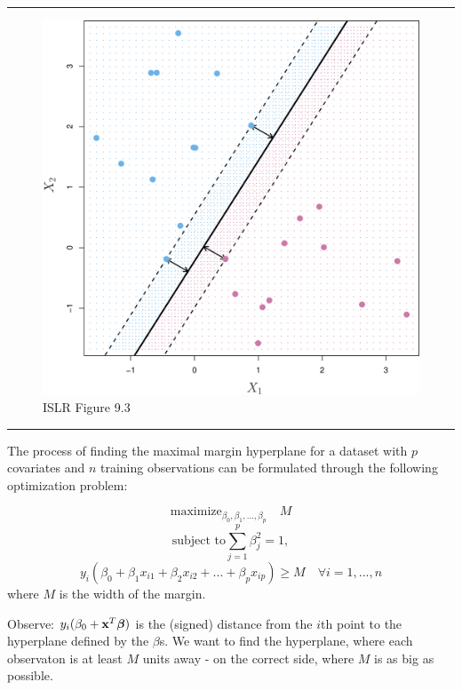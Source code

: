 \documentclass[]{article}
\begin{document}
\begin{center}\rule{0.5\linewidth}{\linethickness}\end{center}

\begin{figure}
\centering
\includegraphics{../ISLR/Chapter9/9.3.png}
\caption{ISLR Figure 9.3}
\end{figure}

\begin{center}\rule{0.5\linewidth}{\linethickness}\end{center}

The process of finding the maximal margin hyperplane for a dataset with
\(p\) covariates and \(n\) training observations can be formulated
through the following optimization problem:

\[\mathrm{maximize}_{\beta_0,\beta_1,...,\beta_p} \quad M \]
\[\text{subject to} \sum_{j=1}^p \beta_j^2=1,\]
\[y_i(\beta_0+\beta_1 x_{i1}+\beta_2 x_{i2}+...+\beta_p x_{ip})\geq M \quad  \forall i=1,...,n\]
where \(M\) is the width of the margin.

Observe: \(y_i(\beta_0+{\bf x}^T {\boldsymbol \beta})\) is the (signed)
distance from the \(i\)th point to the hyperplane defined by the
\(\beta\)s. We want to find the hyperplane, where each observaton is at
least \(M\) units away - on the correct side, where \(M\) is as big as
possible.
\end{document}
